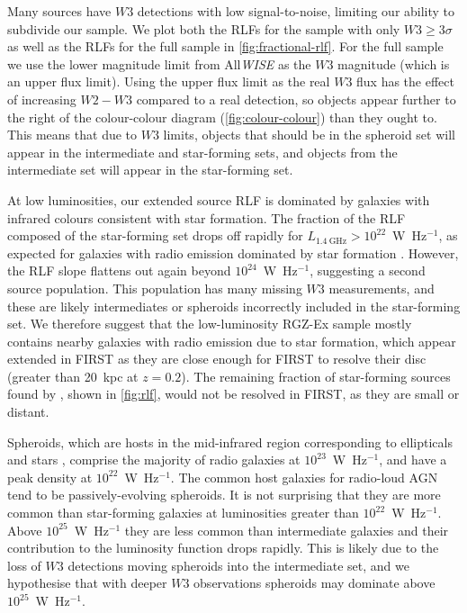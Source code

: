 \documentclass[11pt, a4paper]{book}
\begin{document}
      Many sources have $W3$ detections with low signal-to-noise, limiting our ability to subdivide our sample. We plot both the RLFs for the sample with only $W3 \geq 3 \sigma$ as well as the RLFs for the full sample in \autoref{fig:fractional-rlf}. For the full sample we use the lower magnitude limit from All\emph{WISE} as the $W3$ magnitude (which is an upper flux limit). Using the upper flux limit as the real $W3$ flux has the effect of increasing $W2 - W3$ compared to a real detection, so objects appear further to the right of the colour-colour diagram (\autoref{fig:colour-colour}) than they ought to. This means that due to $W3$ limits, objects that should be in the spheroid set will appear in the intermediate and star-forming sets, and objects from the intermediate set will appear in the star-forming set.

      At low luminosities, our extended source RLF is dominated by galaxies with infrared
      colours consistent with star formation. The fraction
      of the RLF composed of the star-forming set drops off rapidly for
      $L_{1.4\ \mathrm{GHz}} > 10^{22}$~W~Hz$^{-1}$, as expected for galaxies with radio emission
      dominated by star formation \citep[e.g.][]{mauch07rlf}. However, the RLF slope flattens out again beyond $10^{24}$~W~Hz$^{-1}$, suggesting a second source population. This population has many missing $W3$ measurements, and these are likely intermediates or spheroids incorrectly included in the star-forming set. We therefore suggest that the
      low-luminosity RGZ-Ex sample mostly contains nearby galaxies with radio
      emission due to star formation, which appear extended in FIRST as they
      are close enough for FIRST to resolve their
      disc (greater than 20~kpc at $z = 0.2$). The remaining fraction of star-forming sources found by
      \citet{mauch07rlf}, shown in
      \autoref{fig:rlf}, would not be resolved in FIRST, as they are small or
      distant.

      Spheroids, which are hosts in the mid-infrared region corresponding to ellipticals and stars \citep{wright10wise}, comprise the majority of radio galaxies at $10^{23}$~W~Hz$^{-1}$,
      and have a peak density at $10^{22}$~W~Hz$^{-1}$. The common host galaxies for radio-loud AGN tend to be passively-evolving spheroids. It is not surprising that they are more common than star-forming galaxies at luminosities greater than $10^{22}$~W~Hz$^{-1}$. Above
      $10^{25}$~W~Hz$^{-1}$ they are less common than intermediate galaxies and
      their contribution to the luminosity function drops rapidly. This is likely due to the loss of $W3$ detections moving spheroids into the intermediate set, and we hypothesise that with deeper $W3$ observations spheroids may dominate above $10^{25}$~W~Hz$^{-1}$.
\end{document}
